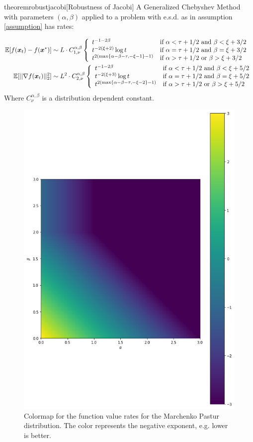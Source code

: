 \documentclass{article}
\begin{document}
\begin{restatable}{theorem}{robustjacobi}[Robustness of Jacobi]\label{thm: jacobirates}
A Generalized Chebyshev Method with parameters $(\alpha,\beta)$ applied to a problem with e.s.d. as in assumption \ref{assumption} has rates:

\begin{align}
\mathbb{E}[f({\boldsymbol x}_t)-f({\boldsymbol x}^\star)]&\sim L\cdot C^{\alpha,\beta}_{1,\nu}
    \left\{\begin{array}{ll}
    t^{-1-2\beta} &\mbox{if } 
		  \alpha<\tau+1/2 \text{ and } \beta <\xi+3/2\\
		  t^{-2(\xi+2)}\log t& \mbox{if } 
		  \alpha=\tau+1/2 \text{ and } \beta =\xi+3/2\\
		  t^{2(\max\{\alpha-\beta-\tau,-\xi-1\}-1)}& \mbox{if } 
		  \alpha>\tau+1/2 \text{ or } \beta >\xi+3/2
	\end{array}\right.\\
	\mathbb{E}[||\nabla f({\boldsymbol x}_t)||^2_2]&\sim L^2\cdot C^{\alpha,\beta}_{2,\nu}
        \left\{\begin{array}{ll}
    t^{-1-2\beta} &\mbox{if } 
		  \alpha<\tau+1/2 \text{ and } \beta <\xi+5/2\\
		  t^{-2(\xi+3)}\log t& \mbox{if } 
		  \alpha=\tau+1/2 \text{ and } \beta =\xi+5/2\\
		  t^{2(\max\{\alpha-\beta-\tau,-\xi-2\}-1)}& \mbox{if } 
		  \alpha>\tau+1/2 \text{ or } \beta >\xi+5/2
	\end{array}\right.
\end{align}
Where $C^{\alpha,\beta}_\nu$ is a distribution dependent constant.
\end{restatable}
\begin{figure}[H]
    \centering
    \includegraphics[width=4 cm]{imgs/colormap.png}
    
    \caption{Colormap for the function value rates  for the Marchenko Pastur distribution. The color represents the negative exponent, e.g. lower is better.}
    \label{fig:my_label2}
\end{figure}
\end{document}
